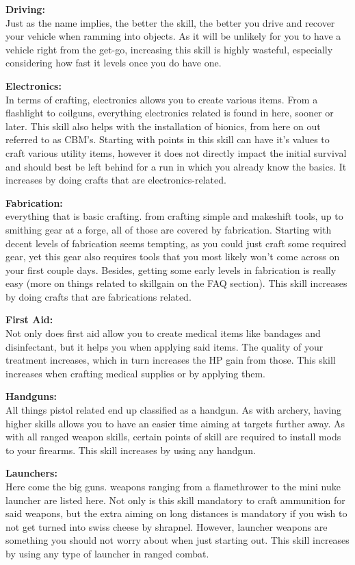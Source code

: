\documentclass[11pt]{report}
\begin{document}
\textbf{Driving:}\\Just as the name implies, the better the skill, the better you drive and recover your vehicle when ramming into objects. As it will be unlikely for you to have a vehicle right from the get-go, increasing this skill is highly wasteful, especially considering how fast it levels once you do have one.

\textbf{Electronics:}\\In terms of crafting, electronics allows you to create various items. From a flashlight to coilguns, everything electronics related is found in here, sooner or later. This skill also helps with the installation of bionics, from here on out referred to as CBM's. Starting with points in this skill can have it's values to craft various utility items, however it does not directly impact the initial survival and should best be left behind for a run in which you already know the basics. It increases by doing crafts that are electronics-related.

\textbf{Fabrication:}\\everything that is basic crafting. from crafting simple and makeshift tools, up to smithing gear at a forge, all of those are covered by fabrication. Starting with decent levels of fabrication seems tempting, as you could just craft some required gear, yet this gear also requires tools that you most likely won't come across on your first couple days. Besides, getting some early levels in fabrication is really easy (more on things related to skillgain on the FAQ section). This skill increases by doing crafts that are fabrications related.

\textbf{First Aid:}\\Not only does first aid allow you to create medical items like bandages and disinfectant, but it helps you when applying said items. The quality of your treatment increases, which in turn increases the HP gain from those. This skill increases when crafting medical supplies or by applying them.

\textbf{Handguns:}\\All things pistol related end up classified as a handgun. As with archery, having higher skills allows you to have an easier time aiming at targets further away. As with all ranged weapon skills, certain points of skill are required to install mods to your firearms. This skill increases by using any handgun.

\textbf{Launchers:}\\Here come the big guns. weapons ranging from a flamethrower to the mini nuke launcher are listed here. Not only is this skill mandatory to craft ammunition for said weapons, but the extra aiming on long distances is mandatory if you wish to not get turned into swiss cheese by shrapnel. However, launcher weapons are something you should not worry about when just starting out. This skill increases by using any type of launcher in ranged combat.
\end{document}
